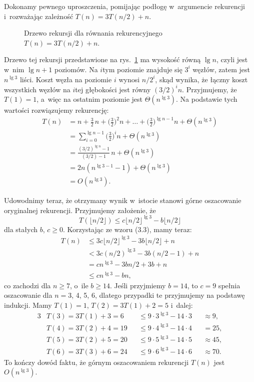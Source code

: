 
\exercise %
Dokonamy pewnego uproszczenia, pomijając podłogę w~argumencie rekurencji i~rozważając zależność $T(n)=3T(n/2)+n$.
\begin{figure}[!ht]
	\centering 
	\caption{Drzewo rekursji dla równania rekurencyjnego $T(n)=3T(n/2)+n$.} \label{fig:4.2-1}
\end{figure}
Drzewo tej rekursji przedstawione na rys.\ \ref{fig:4.2-1} ma wysokość równą $\lg n$, czyli jest w~nim $\lg n+1$ poziomów.
Na $i$\nbhyphen tym poziomie znajduje się $3^i$ węzłów, zatem jest $n^{\lg3}$ liści.
Koszt węzła na poziomie $i$ wynosi $n/2^i$, skąd wynika, że łączny koszt wszystkich węzłów na $i$\nbhyphen tej głębokości jest równy $(3/2)^in$.
Przyjmujemy, że $T(1)=1$, a~więc na ostatnim poziomie jest $\Theta(n^{\lg3})$.
Na podstawie tych wartości rozwiązujemy rekurencję:
\begin{align*}
	T(n) &= n+\frac{3}{2}\,n+\biggl(\frac{3}{2}\biggr)^2n+\dots+\biggl(\frac{3}{2}\biggr)^{\lg n-1}n+\Theta(n^{\lg3}) \\
	&= \sum_{i=0}^{\lg n-1}\biggl(\frac{3}{2}\biggr)^in+\Theta(n^{\lg3}) \\
	&= \frac{(3/2)^{\lg n}-1}{(3/2)-1}\,n+\Theta(n^{\lg3}) \\[1mm]
	&= 2n(n^{\lg3-1}-1)+\Theta(n^{\lg3}) \\
	&= O(n^{\lg3}).
\end{align*}

Udowodnimy teraz, że otrzymany wynik w~istocie stanowi górne oszacowanie oryginalnej rekurencji.
Przyjmujemy założenie, że
\[
	T(\lfloor n/2\rfloor) \le c\lfloor n/2\rfloor^{\lg3}-b\lfloor n/2\rfloor
\]
dla stałych $b$, $c\ge0$.
Korzystając ze wzoru (3.3), mamy teraz:
\begin{align*}
	T(n) &\le 3c\lfloor n/2\rfloor^{\lg3}-3b\lfloor n/2\rfloor+n \\
	&< 3c(n/2)^{\lg3}-3b(n/2-1)+n \\
	&= cn^{\lg3}-3bn/2+3b+n \\
	&\le cn^{\lg3}-bn,
\end{align*}
co zachodzi dla $n\ge7$, o~ile $b\ge14$.
Jeśli przyjmiemy $b=14$, to $c=9$ spełnia oszacowanie dla $n=3$, 4, 5, 6, dlatego przypadki te przyjmujemy na podstawę indukcji.
Mamy $T(1)=1$, $T(2)=3T(1)+2=5$ i~dalej:
\begin{alignat*}{3}
	& T(3)=3T(1)+3=6 && \le9\cdot3^{\lg3}-14\cdot3 && \approx9, \\
	& T(4)=3T(2)+4=19 && \le9\cdot4^{\lg3}-14\cdot4 && =25, \\
	& T(5)=3T(2)+5=20 && \le9\cdot5^{\lg3}-14\cdot5 && \approx45, \\
	& T(6)=3T(3)+6=24 && \le9\cdot6^{\lg3}-14\cdot6 && \approx70.
\end{alignat*}
To kończy dowód faktu, że górnym oszacowaniem rekurencji $T(n)$ jest $O(n^{\lg3})$.

